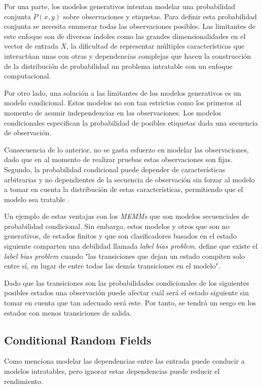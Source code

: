 \documentclass[letterpaper,12pt,oneside]{scrbook}
\theoremstyle{definition}
\begin{document}
	
	Por una parte, los modelos generativos intentan modelar una probabilidad conjunta $P(x,y)$ sobre observaciones y etiquetas. Para definir esta probabilidad conjunta se necesita enumerar todas las observaciones posibles. Las limitantes de este enfoque son de diversas índoles como las grandes dimensionalidades en el vector de entrada $X$, la dificultad de representar múltiples características que interactúan unas con otras y dependencias complejas que hacen la construcción de la distribución de probabilidad un problema intratable con un enfoque computacional.

	
	Por otro lado, una solución a las limitantes de los modelos generativos es un modelo condicional. Estos modelos no son tan estrictos como los primeros al momento de asumir independencias en las observaciones. Los modelos condicionales especifican la probabilidad de posibles etiquetas dada una secuencia de observación.

	
	Consecuencia de lo anterior, no se gasta esfuerzo en modelar las observaciones, dado que en al momento de realizar pruebas estas observaciones son fijas. Segundo, la probabilidad condicional puede depender de características arbitrarias y no dependientes de la secuencia de observación sin forzar al modelo a tomar en cuenta la distribución de estas características, permitiendo que el modelo sea tratable \citep{lafferty2001conditional}.

	
	Un ejemplo de estas ventajas con los \textit{MEMMs} que son modelos secuenciales de probabilidad condicional. Sin embargo, estos modelos y otros que son no generativos, de estados finitos y que son clasificadores basados en el estado siguiente comparten una debilidad llamada \emph{label bias problem}. \citet{lafferty2001conditional} define que existe el \emph{label bias problem} cuando "las transiciones que dejan un estado compiten solo entre sí, en lugar de entre todas las demás transiciones en el modelo".

	
	Dado que las transiciones son las probabilidades condicionales de los siguientes posibles estados una observación puede afectar cuál será el estado siguiente sin tomar en cuenta que tan adecuado será este. Por tanto, se tendrá un sesgo en los estados con menos transiciones de salida.

	
	\subsection{Conditional Random Fields}

	
	Como menciona \citet{sutton2012introduction} modelar las dependencias entre las entrada puede conducir a modelos intratables, pero ignorar estas dependencias puede reducir el rendimiento.
\end{document}
